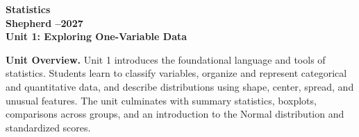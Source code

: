 \documentclass[10pt]{article}
\begin{document}
\vspace{-1.3in}

\begin{center}
  {\color{white}\bfseries\fontsize{28}{34}\selectfont Statistics}\\[8pt]
  {\color{goldacc}\bfseries\Large Shepherd --2027}\\[14pt]
  {\color{white}\bfseries\LARGE Unit 1: Exploring One-Variable Data}\\[4pt]
\end{center}

\vspace{0.30in}

\begin{tcolorbox}[colback=sky,colframe=navy,boxrule=0.9pt,arc=2mm,
    left=4mm,right=4mm,top=3mm,bottom=3mm]
  \textbf{Unit Overview.}\quad
  Unit 1 introduces the foundational language and tools of statistics. Students learn
  to classify variables, organize and represent categorical and quantitative data,
  and describe distributions using shape, center, spread, and unusual features.
  The unit culminates with summary statistics, boxplots, comparisons across groups,
  and an introduction to the Normal distribution and standardized scores.
\end{tcolorbox}

\vspace{0.22in}
\end{document}
